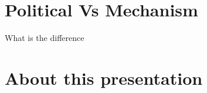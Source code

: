 \documentclass[10pt, compress, aspectratio=169]{beamer}
\begin{document}
\section{Political Vs Mechanism}
\begin{frame}{What is the difference}
\end{frame}

\section{About this presentation}
\begin{frame}[standout]
   \begin{center}\ccbysa\end{center}
\end{frame}


\maketitle
\end{document}
